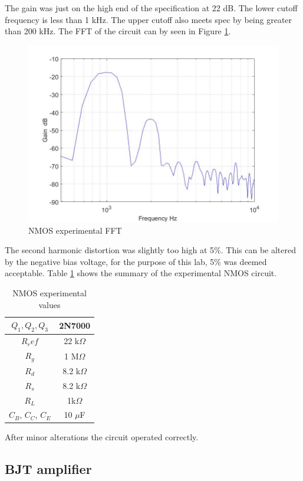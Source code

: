 The gain was just on the high end of the specification at 22 dB. The lower cutoff frequency is less than 1 kHz. The upper cutoff also meets spec by being greater than 200 kHz. The FFT of the circuit can by seen in Figure \ref{fig:nmosfft}.

\begin{figure}[H]
	\centering
	\includegraphics[width=0.7\linewidth]{ExperimentalImplementation/nmos_fft.jpg}
	\caption{NMOS experimental FFT}
	\label{fig:nmosfft}
\end{figure}

The second harmonic distortion was slightly too high at 5\%. This can be altered by the negative bias voltage, for the purpose of this lab, 5\% was deemed acceptable. Table \ref{tab:nmosexp} shows the summary of the experimental NMOS circuit.


\begin{table}[H]
	\centering
	\caption{NMOS experimental values}
	\label{tab:nmosexp}
	\begin{tabular}{cc}
		$Q_1, Q_2, Q_3$ & 2N7000        \\ \hline
		$R_ref$         & 22 k$\Omega$ \\ \hline
		$R_g$           & 1 M$\Omega$  \\ \hline
		$R_d$           & 8.2 k$\Omega$   \\ \hline
		$R_s$           & 8.2 k$\Omega$  \\ \hline
		$R_L$           & 1k$\Omega$    \\ \hline
		$C_B$, $C_C$, $C_E$ & 10 $\mu$F         \\ \hline   
	\end{tabular}
\end{table}

After minor alterations the circuit operated correctly.



\subsection{BJT amplifier}

